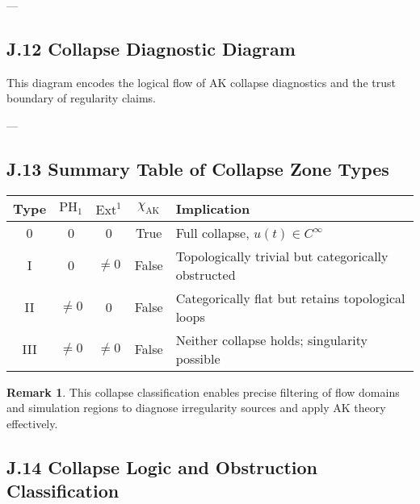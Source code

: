 \documentclass[11pt]{article}
\theoremstyle{definition}
\newtheorem{remark}[theorem]{Remark}
\begin{document}
---

\subsection*{J.12 Collapse Diagnostic Diagram}

\begin{center}
\end{center}

This diagram encodes the logical flow of AK collapse diagnostics and the trust boundary of regularity claims.

---

\subsection*{J.13 Summary Table of Collapse Zone Types}

\begin{center}
\renewcommand{\arraystretch}{1.3}
\begin{tabular}{|c|c|c|c|l|}
\hline
\textbf{Type} & $\mathrm{PH}_1$ & $\mathrm{Ext}^1$ & $\chi_{\text{AK}}$ & \textbf{Implication} \\
\hline
0 & 0 & 0 & True & Full collapse, $u(t) \in C^\infty$ \\
I & 0 & $\neq 0$ & False & Topologically trivial but categorically obstructed \\
II & $\neq 0$ & 0 & False & Categorically flat but retains topological loops \\
III & $\neq 0$ & $\neq 0$ & False & Neither collapse holds; singularity possible \\
\hline
\end{tabular}
\end{center}

\begin{remark}
This collapse classification enables precise filtering of flow domains and simulation regions  
to diagnose irregularity sources and apply AK theory effectively.
\end{remark}

\subsection*{J.14 Collapse Logic and Obstruction Classification}
\end{document}
